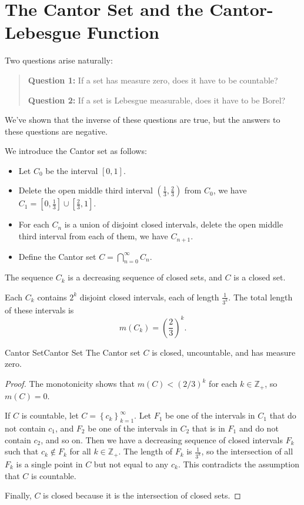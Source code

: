 \documentclass[../main.tex]{subfiles}
\begin{document}
\section{The Cantor Set and the Cantor-Lebesgue Function}
Two questions arise naturally:
\begin{quote}
	\textbf{Question 1:} If a set has measure zero, does it have to be countable?
	
	\textbf{Question 2:} If a set is Lebesgue measurable, does it have to be Borel?
\end{quote}
We've shown that the inverse of these questions are true, but the answers to these questions are negative.

We introduce the Cantor set as follows:
\begin{itemize}
\item Let $C_0$ be the interval $[0,1]$.
\item Delete the open middle third interval $(\frac{1}{3},\frac{2}{3})$ from $C_0$, we have $C_1 = [0,\frac{1}{3}] \cup [\frac{2}{3},1]$.
\item For each $C_n$ is a union of disjoint closed intervals, delete the open middle third interval from each of them, we have $C_{n+1}$.
\item Define the Cantor set $C = \bigcap_{n=0}^{\infty } C_n$.
\end{itemize}

\begin{remark}
	The sequence $C_k$ is a decreasing sequence of closed sets, and $C$ is a closed set.

	Each $C_k$ contains $2^k$ disjoint closed intervals, each of length $\frac{1}{3^k}$. The total length of these intervals is
	\begin{equation*}
		m(C_k) = \left( \frac{2}{3} \right)^k.
	\end{equation*}
\end{remark}

\begin{proposition}{Cantor Set}{Cantor Set}
The Cantor set $C$ is closed, uncountable, and has measure zero.
\end{proposition}
\begin{proof}
	The monotonicity shows that $m(C) < (2 / 3)^k$ for each $k\in \mathbb{Z}_+$, so $m(C) = 0$.

	If $C$ is countable, let $C = \left\{ c_k \right\}_{k=1}^{\infty }$. Let $F_1$ be one of the intervals in $C_1$ that do not contain $c_1$, and $F_2$ be one of the intervals in $C_2$ that is in $F_1$ and do not contain $c_2$, and so on. Then we have a decreasing sequence of closed intervals $F_k$ such that $c_k \notin F_k$ for all $k\in \mathbb{Z}_+$. The length of $F_k$ is $\frac{1}{3^k}$, so the intersection of all $F_k$ is a single point in $C$ but not equal to any $c_k$. This contradicts the assumption that $C$ is countable.

	Finally, $C$ is closed because it is the intersection of closed sets.
\end{proof}
\end{document}
